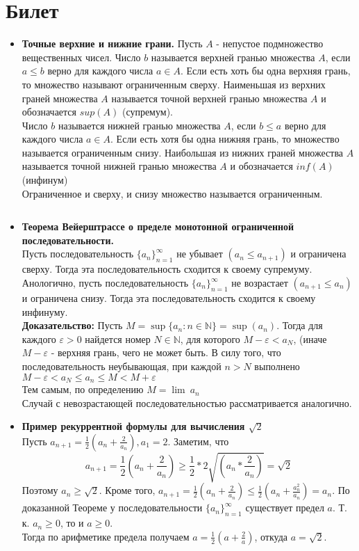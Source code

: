 \documentclass[12pt,a4paper]{article}
\begin{document}
\section{Билет}
\begin{itemize}
	\item \textbf{Точные верхние и нижние грани.}
	Пусть $A$ - непустое подмножество вещественных чисел.
	Число $b$ называется верхней гранью множества $A$, если $a \leq b$ верно для каждого числа $a \in A$. Если есть хоть бы одна верхняя грань, то множество называют ограниченным сверху. Наименьшая из верхних граней множества $A$ называется точной верхней гранью множества $A$ и обозначается $sup(A)$ (супремум).\\
	Число $b$ называется нижней гранью множества $A$, если $b \leq a$ верно для каждого числа $a \in A$. Если есть хотя бы одна нижняя грань, то множество называется ограниченным снизу. Наибольшая из нижних граней множества $A$ называется точной нижней гранью множества  $A$ и обозначается $inf(A)$ (инфинум)\\
	Ограниченное и сверху, и снизу множество называется ограниченным.

$\;$
\item \textbf{Теорема Вейерштрассе о пределе монотонной ограниченной последовательности.} \\
	Пусть последовательность $\{a_n\}_{n=1}^{\infty}$ не убывает $(a_n \leq a_{n + 1})$ и ограничена сверху. Тогда эта последовательность сходится к своему супремуму.\\
	Анологично, пусть последовательность $\{a_n\}_{n=1}^{\infty}$ не возрастает $(a_{n + 1} \leq a_n)$ и ограничена снизу. Тогда эта последовательность сходится к своему инфинуму.\\
	\textbf{Доказательство:} Пусть $M = \sup\{a_n : n \in \mathbb{N}\} = \sup(a_n)$. Тогда для каждого $\varepsilon > 0$ найдется номер $N \in \mathbb{N}$, для которого $M - \varepsilon < a_N$, (иначе $M - \varepsilon$ - верхняя грань, чего не может быть. В силу того, что последовательность неубывающая, при каждой $n > N$ выполнено $M - \varepsilon < a_N \leq a_n \leq M < M + \varepsilon $\\
	Тем самым, по определению $M = \lim\ a_n$\\
	Случай с невозрастающей последовательностью рассматривается аналогично.\\
	
\item \textbf{Пример рекуррентной формулы для вычисления $\sqrt2$\\}
	Пусть $a_{n + 1} = \frac{1}{2} (a_n + \frac{2}{a_n}), a_1 = 2$. Заметим, что
	 \[a_{n + 1} = \frac{1}{2} (a_n + \frac{2}{a_n}) \geq \frac{1}{2} * 2 \sqrt{(a_n * \frac{2}{a_n})} = \sqrt2\] 
	Поэтому $a_n \geq \sqrt2$. Кроме того, $a_{n + 1} = \frac{1}{2} (a_n + \frac{2}{a_n}) \leq \frac{1}{2} (a_n + \frac{a_n^2}{a_n}) = a_n$. По доказанной Теореме у последовательности $\{a_n\}_{n=1}^{\infty}$ существует предел $a$. Т. к. $a_n \geq 0$, то и $a \geq 0$.\\
	Тогда по арифметике предела получаем $a = \frac{1}{2} (a + \frac{2}{a})$, откуда $a = \sqrt2$.

\end{itemize}
\end{document}
